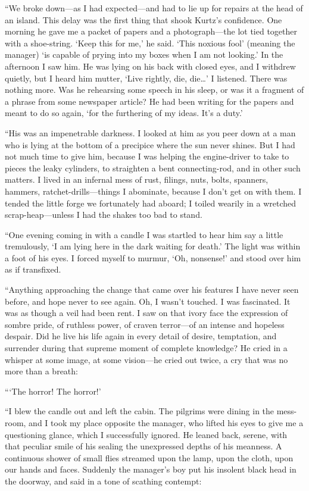 \documentclass[12pt]{report}
\begin{document}
``We broke down---as I had expected---and had to lie up for repairs at
the head of an island. This delay was the first thing that shook Kurtz's
confidence. One morning he gave me a packet of papers and a
photograph---the lot tied together with a shoe-string. `Keep this for
me,' he said. `This noxious fool' (meaning the manager) `is capable of
prying into my boxes when I am not looking.' In the afternoon I saw him.
He was lying on his back with closed eyes, and I withdrew quietly, but I
heard him mutter, `Live rightly, die, die\ldots{}' I listened. There was
nothing more. Was he rehearsing some speech in his sleep, or was it a
fragment of a phrase from some newspaper article? He had been writing
for the papers and meant to do so again, `for the furthering of my
ideas. It's a duty.'

``His was an impenetrable darkness. I looked at him as you peer down at
a man who is lying at the bottom of a precipice where the sun never
shines. But I had not much time to give him, because I was helping the
engine-driver to take to pieces the leaky cylinders, to straighten a
bent connecting-rod, and in other such matters. I lived in an infernal
mess of rust, filings, nuts, bolts, spanners, hammers,
ratchet-drills---things I abominate, because I don't get on with them. I
tended the little forge we fortunately had aboard; I toiled wearily in a
wretched scrap-heap---unless I had the shakes too bad to stand.

``One evening coming in with a candle I was startled to hear him say a
little tremulously, `I am lying here in the dark waiting for death.' The
light was within a foot of his eyes. I forced myself to murmur, `Oh,
nonsense!' and stood over him as if transfixed.

``Anything approaching the change that came over his features I have
never seen before, and hope never to see again. Oh, I wasn't touched. I
was fascinated. It was as though a veil had been rent. I saw on that
ivory face the expression of sombre pride, of ruthless power, of craven
terror---of an intense and hopeless despair. Did he live his life again
in every detail of desire, temptation, and surrender during that supreme
moment of complete knowledge? He cried in a whisper at some image, at
some vision---he cried out twice, a cry that was no more than a breath:

```The horror! The horror!'

``I blew the candle out and left the cabin. The pilgrims were dining in
the mess-room, and I took my place opposite the manager, who lifted his
eyes to give me a questioning glance, which I successfully ignored. He
leaned back, serene, with that peculiar smile of his sealing the
unexpressed depths of his meanness. A continuous shower of small flies
streamed upon the lamp, upon the cloth, upon our hands and faces.
Suddenly the manager's boy put his insolent black head in the doorway,
and said in a tone of scathing contempt:
\end{document}

